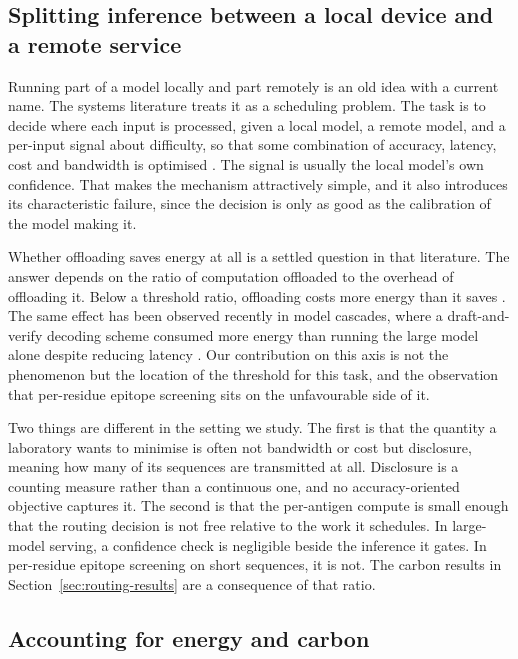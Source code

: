 \subsection{Splitting inference between a local device and a remote service}

Running part of a model locally and part remotely is an old idea with a current
name. The systems literature treats it as a scheduling problem. The task is to
decide where each input is processed, given a local
model, a remote model, and a per-input signal about difficulty, so that some
combination of accuracy, latency, cost and bandwidth is optimised
\citep{matsubara2022split}. The signal is usually the
local model's own confidence. That makes the mechanism attractively simple, and
it also introduces its characteristic failure, since the decision is only as
good as the calibration of the model making it.

Whether offloading saves energy at all is a settled question in that
literature. The answer depends on the ratio of computation offloaded to the
overhead of offloading it. Below a threshold ratio, offloading costs more energy
than it saves \citep{kumar2010cloud}. The same effect has been observed
recently in model cascades, where a draft-and-verify decoding scheme consumed
more energy than running the large model alone despite reducing latency
\citep{dutta2026speculative}. Our contribution on this axis is not the
phenomenon but the location of the threshold for this task, and the observation
that per-residue epitope screening sits on the unfavourable side of it.

Two things are different in the setting we study. The first is that the
quantity a laboratory wants to minimise is often not bandwidth or cost but
disclosure, meaning how many of its sequences are transmitted at all.
Disclosure is a counting measure rather than a continuous one, and no
accuracy-oriented objective captures it. The second is that the per-antigen
compute is small enough that the routing decision is not free relative to the
work it schedules.
In large-model serving, a confidence check is negligible beside the inference it
gates. In per-residue epitope screening on short sequences, it is not. The
carbon results in Section~\ref{sec:routing-results} are a consequence of that
ratio.

\subsection{Accounting for energy and carbon}

